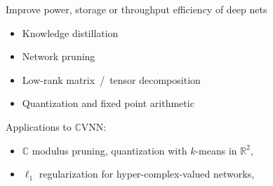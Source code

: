 \documentclass{beamer}
\newcommand{\real}{\mathbb{R}}
\newcommand{\cplx}{\mathbb{C}}
\begin{document}
\begin{frame}[c]{\insertsection}
  Improve power, storage or throughput efficiency of deep nets
  \begin{itemize}
    \item Knowledge distillation
      {\tiny \\ \quad
        \citep{hinton_distilling_2015,balasubramanian_deep_2016}}

    \smallskip
    \item Network pruning
      {\tiny \\ \quad
        \citep{lecun_optimal_1990,seide_conversational_2011,zhu_prune_2018}}

    \smallskip
    \item Low-rank matrix~/~tensor decomposition
      {\tiny \\ \quad
        \citep{denton_exploiting_2014,novikov_tensorizing_2015}}

    \smallskip
    \item Quantization and fixed point arithmetic
      {\tiny \\ \quad
        \citep{courbariaux_training_2015,han_deep_2016,chen_fxpnet_2017}}
  \end{itemize}

  \bigskip
  Applications to $\cplx$VNN:
  \begin{itemize}
    \item $\cplx$ modulus pruning, quantization with $k$-means in $
        \real^2%
      $, 
      {\tiny \\ \quad
        \citep{wu_compressing_2019}}

    \smallskip
    \item $\ell_1$ regularization for hyper-complex-valued networks,
      {\tiny \\ \quad
        \citep{vecchi_compressing_2020}}
  \end{itemize}

\end{frame}
\end{document}
